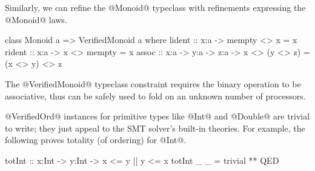 
%
Similarly, we can refine the @Monoid@ typeclass with refinements
expressing the @Monoid@ laws.
%
\begin{code}
    class Monoid a => VerifiedMonoid a where
      lident :: x:a -> { mempty <> x = x }
      rident :: x:a -> { x <> mempty = x }
      assoc  :: x:a -> y:a -> z:a -> { x <> (y <> z) = (x <> y) <> z }
\end{code}
The @VerifiedMonoid@ typeclass constraint requires the binary operation
to be associative, thus can be safely used to fold on
an unknown number of processors.







@VerifiedOrd@ instances for primitive types like @Int@ and @Double@ are trivial to
write; they just appeal to the SMT solver's built-in theories.
%
For example, the following proves totality (of ordering) for @Int@.
\begin{code}
    totInt :: x:Int -> y:Int -> {x <= y || y <= x}
    totInt _ _ = trivial ** QED
\end{code}


